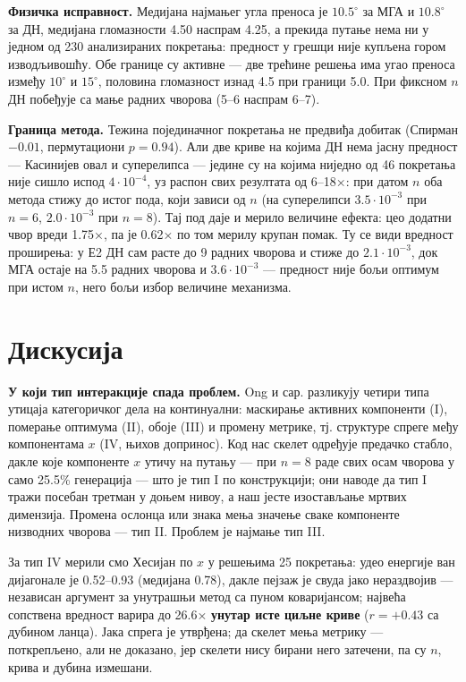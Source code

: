 \documentclass[
  conference,
  a4paper,
  10pt]{IEEEtran}
\begin{document}
\textbf{Физичка исправност.} Медијана најмањег угла преноса је
\(10.5^\circ\) за МГА и \(10.8^\circ\) за ДН, медијана гломазности 4.50
наспрам 4.25, а прекида путање нема ни у једном од 230 анализираних
покретања: предност у грешци није купљена гором изводљивошћу. Обе
границе су активне --- две трећине решења има угао преноса између
\(10^\circ\) и \(15^\circ\), половина гломазност изнад 4.5 при граници
5.0. При фиксном \(n\) ДН побеђује са мање радних чворова (5--6 наспрам
6--7).

\textbf{Граница метода.} Тежина појединачног покретања не предвиђа
добитак (Спирман \(-0.01\), пермутациони \(p = 0.94\)). Али две криве на
којима ДН нема јасну предност --- Касинијев овал и суперелипса ---
једине су на којима ниједно од 46 покретања није сишло испод
\(4\cdot10^{-4}\), уз распон свих резултата од 6--18×: при датом \(n\)
оба метода стижу до истог пода, који зависи од \(n\) (на суперелипси
\(3.5\cdot10^{-3}\) при \(n=6\), \(2.0\cdot10^{-3}\) при \(n=8\)). Тај
под даје и мерило величине ефекта: цео додатни чвор вреди 1.75×, па је
0.62× по том мерилу крупан помак. Ту се види вредност проширења: у Е2 ДН
сам расте до 9 радних чворова и стиже до \(2.1\cdot10^{-3}\), док МГА
остаје на 5.5 радних чворова и \(3.6\cdot10^{-3}\) --- предност није
бољи оптимум при истом \(n\), него бољи избор величине механизма.

\hypertarget{ux434ux438ux441ux43aux443ux441ux438ux458ux430}{%
\section{Дискусија}\label{ux434ux438ux441ux43aux443ux441ux438ux458ux430}}

\textbf{У који тип интеракције спада проблем.} Ong и сар. \citep{igbd}
разликују четири типа утицаја категоричког дела на континуални:
маскирање активних компоненти (I), померање оптимума (II), обоје (III) и
промену метрике, тј. структуре спреге међу компонентама \(x\) (IV, њихов
допринос). Код нас скелет одређује предачко стабло, дакле које
компоненте \(x\) утичу на путању --- при \(n=8\) раде свих осам чворова
у само 25.5\% генерација --- што је тип I по конструкцији; они наводе да
тип I тражи посебан третман у доњем нивоу, а наш јесте изостављање
мртвих димензија. Промена ослонца или знака мења значење сваке
компоненте низводних чворова --- тип II. Проблем је најмање тип III.

За тип IV мерили смо Хесијан по \(x\) у решењима 25 покретања: удео
енергије ван дијагонале је 0.52--0.93 (медијана 0.78), дакле пејзаж је
свуда јако нераздвојив --- независан аргумент за унутрашњи метод са
пуном коваријансом; највећа сопствена вредност варира до 26.6×
\textbf{унутар исте циљне криве} (\(r = +0.43\) са дубином ланца). Јака
спрега је утврђена; да скелет мења метрику --- поткрепљено, али не
доказано, јер скелети нису бирани него затечени, па су \(n\), крива и
дубина измешани.
\end{document}
